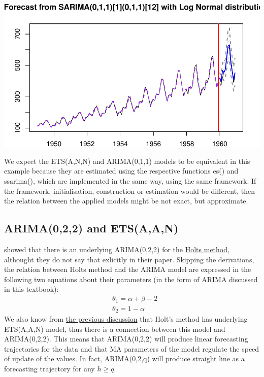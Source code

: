 \documentclass[
]{book}
\theoremstyle{definition}
\theoremstyle{definition}
\theoremstyle{definition}
\theoremstyle{definition}
\theoremstyle{remark}
\begin{document}
\includegraphics{adam_files/figure-latex/unnamed-chunk-63-1.pdf}

We expect the ETS(A,N,N) and ARIMA(0,1,1) models to be equivalent in this example because they are estimated using the respective functions es() and ssarima(), which are implemented in the same way, using the same framework. If the framework, initialisation, construction or estimation would be different, then the relation between the applied models might be not exact, but approximate.

\hypertarget{ARIMAETS022}{%
\subsection{ARIMA(0,2,2) and ETS(A,A,N)}\label{ARIMAETS022}}

\citet{Nerlove1964} showed that there is an underlying ARIMA(0,2,2) for the \protect\hyperlink{ETSAAN}{Holts method}, althought they do not say that exlicitly in their paper. Skipping the derivations, the relation between Holts method and the ARIMA model are expressed in the following two equations about their parameters (in the form of ARIMA discussed in this textbook):
\begin{equation*}
  \begin{aligned}
    &\theta_1 = \alpha + \beta - 2 \\
    &\theta_2 = 1 -\alpha
  \end{aligned}
\end{equation*}
We also know from \protect\hyperlink{ETSExamples}{the previous discussion} that Holt's method has underlying ETS(A,A,N) model, thus there is a connection between this model and ARIMA(0,2,2). This means that ARIMA(0,2,2) will produce linear forecasting trajectories for the data and that MA parameters of the model regulate the speed of update of the values. In fact, ARIMA(0,2,q) will produce straight line as a forecasting trajectory for any \(h\geq q\).
\end{document}
